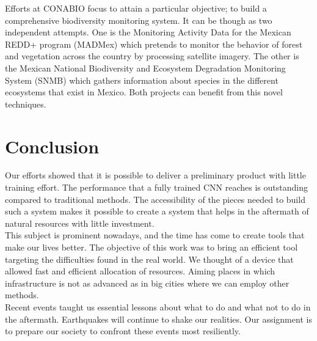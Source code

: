 Efforts at CONABIO focus to attain a particular objective; to build a comprehensive biodiversity monitoring system. It can be though as two independent attempts. One is the Monitoring Activity Data for the Mexican REDD+ program (MADMex) \cite{rs6053923} which pretends to monitor the behavior of forest and vegetation across the country by processing satellite imagery. The other is the Mexican National Biodiversity and Ecosystem Degradation Monitoring System (SNMB) \cite{GARCIAALANIZ201762} which gathers information about species in the different ecosystems that exist in Mexico. Both projects can benefit from this novel techniques.\\

\section{Conclusion}

Our efforts showed that it is possible to deliver a preliminary product with little training effort. The performance that a fully trained CNN reaches is outstanding compared to traditional methods. The accessibility of the pieces needed to build such a system makes it possible to create a system that helps in the aftermath of natural resources with little investment.\\

This subject is prominent nowadays, and the time has come to create tools that make our lives better. The objective of this work was to bring an efficient tool targeting the difficulties found in the real world. We thought of a device that allowed fast and efficient allocation of resources. Aiming places in which infrastructure is not as advanced as in big cities where we can employ other methods.\\

Recent events taught us essential lessons about what to do and what not to do in the aftermath. Earthquakes will continue to shake our realities. Our assignment is to prepare our society to confront these events most resiliently.\\
